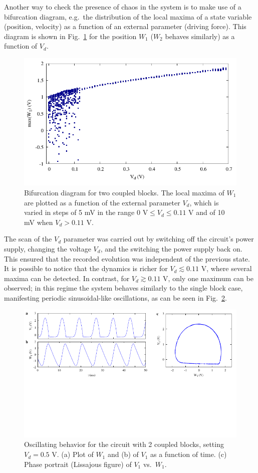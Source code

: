 Another way to check the presence of chaos in the system is to make use of a bifurcation diagram, e.g.\ the distribution
of the local maxima of a state variable (position, velocity) as a function of an external parameter (driving force).
This diagram is shown in Fig.~\ref{fig: bifurcation} for the position $W_1$ ($W_2$ behaves similarly) as a function of $V_d$.

\begin{figure}[!htbp]
    \centering
    \includegraphics[width=0.6\linewidth]{../blocks/2_blocks/bifurcation/bifurcation.pdf}
    \caption{Bifurcation diagram for two coupled blocks.
    The local maxima of $W_1$ are plotted as a function of the external parameter $V_d$,
    which is varied in steps of 5 mV in the range $0\text{ V}\leq V_d \leq 0.11$ V and of 10 mV when $V_d > 0.11$ V.}\label{fig: bifurcation}
\end{figure}
The scan of the $V_d$ parameter was carried out by switching off the circuit's power supply, changing the voltage $V_d$,
and the switching the power supply back on. This ensured that the recorded evolution was independent of the previous state.
It is possible to notice that the dynamics is richer for $V_d\lesssim0.11$ V, where several maxima can be detected.
In contrast, for $V_d\gtrsim0.11$ V, only one maximum can be observed; in this regime the system behaves similarly
to the single block case, manifesting periodic sinusoidal-like oscillations, as can be seen in
Fig.~\ref{fig:2 blocks no chaos}.

\begin{figure}[ht!]
\centering
\includegraphics[width=\linewidth,trim={0 3.5cm 0 0},clip,center]{../blocks/2_blocks/two_blocks_nochaos.pdf}
\caption{Oscillating behavior for the circuit with 2 coupled blocks, setting $V_d=0.5$ V.
(a) Plot of $W_1$ and (b) of $V_1$ as a function of time.
(c) Phase portrait (Lissajous figure) of $V_1$ vs.\ $W_1$.
}\label{fig:2 blocks no chaos}
\end{figure}

